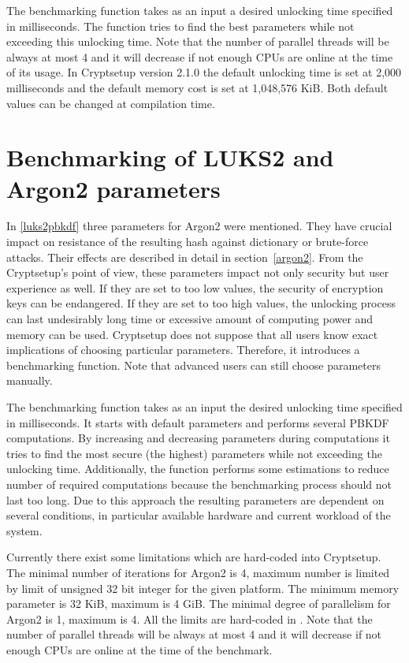 \documentclass[nolof]{fithesis3}
\begin{document}
The benchmarking function takes as an input a desired unlocking time specified in milliseconds. The function tries to find the best parameters while not exceeding this unlocking time. Note that the number of parallel threads will be always at most 4 and it will decrease if not enough CPUs are online at the time of its usage. In Cryptsetup version 2.1.0 the default unlocking time is set at 2,000 milliseconds and the default memory cost is set at 1,048,576 KiB. Both default values can be changed at compilation time.

\section{Benchmarking of LUKS2 and Argon2 parameters}
\label{sec:benchmark}
In \ref{luks2pbkdf} three parameters for Argon2 were mentioned. They have crucial impact on resistance of the resulting hash against dictionary or brute-force attacks. Their effects are described in detail in section~\ref{argon2}. From the Cryptsetup's point of view, these parameters impact not only security but user experience as well. If they are set to too low values, the security of encryption keys can be endangered. If they are set to too high values, the unlocking process can last undesirably long time or excessive amount of computing power and memory can be used. Cryptsetup does not suppose that all users know exact implications of choosing particular parameters. Therefore, it introduces a benchmarking function. Note that advanced users can still choose parameters manually.

The benchmarking function takes as an input the desired unlocking time specified in milliseconds. It starts with default parameters and performs several PBKDF computations. By increasing and decreasing parameters during computations it tries to find the most secure (the highest) parameters while not exceeding the unlocking time. Additionally, the function performs some estimations to reduce number of required computations because the benchmarking process should not last too long. Due to this approach the resulting parameters are dependent on several conditions, in particular available hardware and current workload of the system.

Currently there exist some limitations which are hard-coded into Cryptsetup. The minimal number of iterations for Argon2 is 4, maximum number is limited by limit of unsigned 32 bit integer for the given platform. The minimum memory parameter is 32 KiB, maximum is 4 GiB. The minimal degree of parallelism for Argon2 is 1, maximum is 4. All the limits are hard-coded in \parencite{cryptsetupgitpbkdfcheck}. Note that the number of parallel threads will be always at most 4 and it will decrease if not enough CPUs are online at the time of the benchmark.
\end{document}
